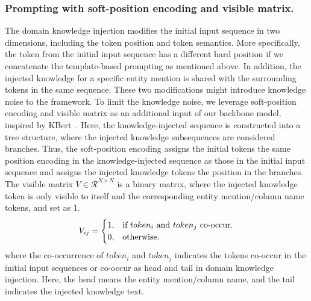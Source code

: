 
\subsubsection{Prompting with soft-position encoding and visible matrix.}
The domain knowledge injection modifies the initial input sequence in two dimensions, including the token position and token semantics. More specifically, the token from the initial input sequence has a different hard position if we concatenate the template-based prompting as mentioned above. In addition, the injected knowledge for a specific entity mention is shared with the surrounding tokens in the same sequence. These two modifications might introduce knowledge noise to the framework. To limit the knowledge noise, we leverage soft-position encoding and visible matrix as an additional input of our backbone model, inspired by KBert~\cite{liu_k-bert_2020}. Here, the knowledge-injected sequence is constructed into a tree structure, where the injected knowledge subsequences are considered branches. Thus, the soft-position encoding assigns the initial tokens the same position encoding in the knowledge-injected sequence as those in the initial input sequence and assigns the injected knowledge tokens the position in the branches. The visible matrix $V\in \mathcal{R}^{N \times N}$ is a binary matrix, where the injected knowledge token is only visible to itself and the corresponding entity mention/column name tokens, and set as 1.
\begin{equation}
    V_{ij} = \begin{cases}
    1, & \text{if $token_i$ \text{and} $token_j$ co-occur}.\\
    0, & \text{otherwise}.
  \end{cases}
\end{equation}
where the co-occurrence of $token_i$ and $token_j$ indicates the tokens co-occur in the initial input sequences or co-occur as head and tail in domain knowledge injection. Here, the head means the entity mention/column name, and the tail indicates the injected knowledge text. 
